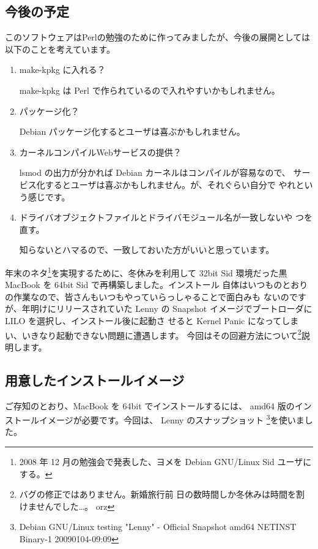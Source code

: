 \documentclass[mingoth,a4paper]{jsarticle}
\begin{document}
\subsection{今後の予定}
このソフトウェアはPerlの勉強のために作ってみましたが、今後の展開としては
以下のことを考えています。
\begin{enumerate}
 \item make-kpkg に入れる？

       make-kpkg は Perl で作られているので入れやすいかもしれません。

 \item パッケージ化？

       Debian パッケージ化するとユーザは喜ぶかもしれません。

 \item カーネルコンパイルWebサービスの提供？

       lsmod の出力が分かれば Debian カーネルはコンパイルが容易なので、
       サービス化するとユーザは喜ぶかもしれません。が、それぐらい自分で
       やれという感じです。

 \item ドライバオブジェクトファイルとドライバモジュール名が一致しないや
       つを直す。

       知らないとハマるので、一致しておいた方がいいと思っています。
\end{enumerate}



年末のネタ\footnote{2008 年 12 月の勉強会で発表した、ヨメを Debian
GNU/Linux Sid ユーザにする。}を実現するために、冬休みを利用して 32bit
Sid 環境だった黒 MacBook を 64bit Sid で再構築しました。インストール
自体はいつものとおりの作業なので、皆さんもいつもやっていらっしゃることで面白みも
ないのですが、年明けにリリースされていた Lenny の
Snapshot イメージでブートローダに LILO を選択し、インストール後に起動さ
せると Kernel Panic になってしまい、いきなり起動できない問題に遭遇します。
今回はその回避方法について\footnote{バグの修正ではありません。新婚旅行前
日の数時間しか冬休みは時間を割けませんでした…。 orz}説明します。


\subsection{用意したインストールイメージ}
ご存知のとおり、MacBook を 64bit でインストールするには、 amd64 版のイン
ストールイメージが必要です。今回は、 Lenny のスナップショット
\footnote{Debian GNU/Linux testing "Lenny" - Official Snapshot amd64
NETINST Binary-1 20090104-09:09}を使いました。
\end{document}
